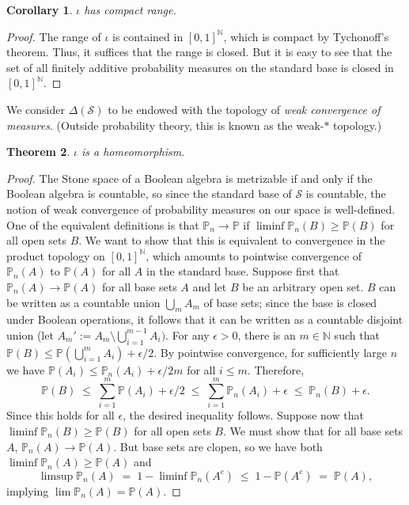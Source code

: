 \documentclass[12pt]{article}
\newcommand{\NN}{\mathbb{N}}
\newcommand{\cS}{\mathcal{S}}
\theoremstyle{plain}
\newtheorem{theorem}{Theorem}[subsection]
\newtheorem{corollary}[theorem]{Corollary}
\theoremstyle{definition}
\theoremstyle{remark}
\begin{document}
\begin{corollary}
$\iota$ has compact range.
\end{corollary}
\begin{proof}
The range of $\iota$ is contained in $[0,1]^\NN$, which is compact by Tychonoff's theorem. Thus, it suffices that the range is closed. But it is easy to see that the set of all finitely additive probability measures on the standard base is closed in $[0,1]^\NN$.
\end{proof}
We consider $\Delta(\cS)$ to be endowed with the topology of \emph{weak convergence of measures}. (Outside probability theory, this is known as the weak-$*$ topology.)
\begin{theorem}
$\iota$ is a homeomorphism.
\end{theorem}
\begin{proof}
The Stone space of a Boolean algebra is metrizable if and only if the Boolean algebra is countable, so since the standard base of $\cS$ is countable, the notion of weak convergence of probability measures on our space is well-defined. One of the equivalent definitions is that $\mathbb{P}_n\to\mathbb{P}$ if $\liminf\mathbb{P}_n(B)\ge\mathbb{P}(B)$ for all open sets $B$. We want to show that this is equivalent to convergence in the product topology on $[0,1]^\NN$, which amounts to pointwise convergence of $\mathbb{P}_n(A)$ to $\mathbb{P}(A)$ for all $A$ in the standard base.
Suppose first that $\mathbb{P}_n(A)\to\mathbb{P}(A)$ for all base sets $A$ and let $B$ be an arbitrary open set. $B$ can be written as a countable union $\textstyle\bigcup_m A_m$ of base sets; since the base is closed under Boolean operations, it follows that it can be written as a countable disjoint union (let $\textstyle A_m' := A_m\setminus\bigcup_{i=1}^{m-1}A_i)$. For any $\epsilon>0$, there is an $m\in\mathbb{N}$ such that $\textstyle\mathbb{P}(B)\le\mathbb{P}(\bigcup_{i=1}^m A_i)+\epsilon/2$. By pointwise convergence, for sufficiently large $n$ we have $\mathbb{P}(A_i)\le\mathbb{P}_n(A_i) + \epsilon/2m$ for all $i\le m$. Therefore,
\[
\textstyle\mathbb{P}(B)\;\le\;\sum_{i=1}^m\mathbb{P}(A_i)+\epsilon/2\;\le\;\sum_{i=1}^m\mathbb{P}_n(A_i) + \epsilon\;\le\;\mathbb{P}_n(B)+\epsilon.
\]
Since this holds for all $\epsilon$, the desired inequality follows.
Suppose now that $\liminf\mathbb{P}_n(B)\ge\mathbb{P}(B)$ for all open sets $B$. We must show that for all base sets $A$, $\mathbb{P}_n(A)\to\mathbb{P}(A)$. But base sets are clopen, so we have both $\liminf\mathbb{P}_n(A)\ge\mathbb{P}(A)$ and
\[
\limsup\mathbb{P}_n(A) \;=\; 1-\liminf\mathbb{P}_n(A^c) \;\le\; 1 - \mathbb{P}(A^c) \;=\; \mathbb{P}(A),
\]
implying $\lim\mathbb{P}_n(A) = \mathbb{P}(A)$.
\end{proof}
\end{document}
